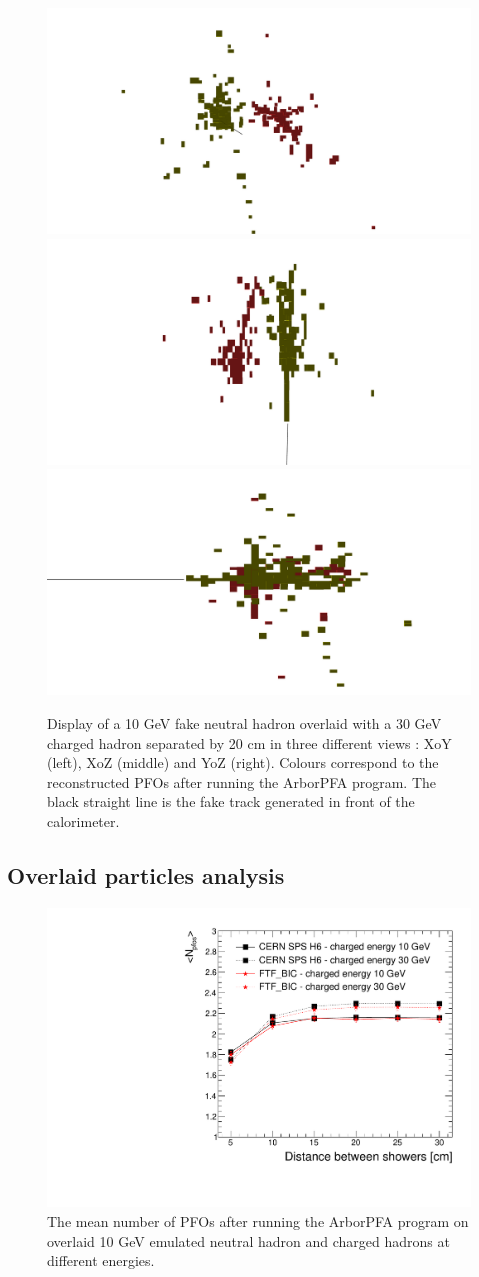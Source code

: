 \documentclass[cits]{JINST}
\begin{document}
\begin{figure}[!h]
  \begin{center}
    \includegraphics[width=0.32\linewidth]{ArborPFA_PandoraMonitoring_SDHCAL_Overlay_XY.pdf}
    \includegraphics[width=0.32\linewidth]{ArborPFA_PandoraMonitoring_SDHCAL_Overlay_XZ.pdf}
    \includegraphics[width=0.32\linewidth]{ArborPFA_PandoraMonitoring_SDHCAL_Overlay_YZ.pdf}
  \end{center}
  \caption{\label{OVERLAY_EVENT_DISPLAY} Display of a 10 GeV fake neutral hadron overlaid with a 30 GeV charged hadron separated by 20 cm in three different views : XoY (left), XoZ (middle) and YoZ (right). Colours correspond to the reconstructed PFOs after running the ArborPFA program. The black straight line is the fake track generated in front of the calorimeter.}
\end{figure}

\subsection{Overlaid particles analysis}

\begin{figure}[!h]
  \begin{center}
    \includegraphics[width=0.6\linewidth]{plots/OverlayEvent/OverlayEvent_NPfos.pdf}
  \end{center}
  \caption{\label{OVERLAY_EVENT_NPFOS} The mean number of PFOs after running the ArborPFA program on overlaid 10 GeV emulated neutral hadron and charged hadrons at different energies.}
\end{figure}
\end{document}

